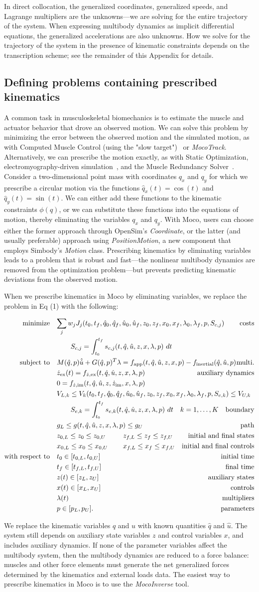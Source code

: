 \documentclass[10pt,letterpaper]{article}
\newcommand{\prescribed}{
\begin{align}
    \begin{aligned}
        \mbox{minimize} \quad & \mathrlap{\sum_j w_j J_{j}(t_0, t_f, \hat{q}_0, \hat{q}_f, \hat{u}_0, \hat{u}_f, z_0, z_f, x_{0}, x_{f}, \lambda_0, \lambda_f, p, S_{c,j})} &&& \textrm{costs} \\
        & \quad\quad \mathrlap{S_{c,j} = \int_{t_0}^{t_f} s_{c,j}(t, \hat{q}, \hat{u}, z, x, \lambda, p)~dt} \\
        \mbox{subject to} \quad &
         M(\hat{q}, p)\hat{\dot{u}} + \mathrlap{G(\hat{q}, p)^T \lambda = f_{\textrm{app}}(t, \hat{q}, \hat{u}, z, x, p) - f_{\textrm{inertial}}(\hat{q}, \hat{u}, p)} &&& \textrm{multi.} \\
        & \mathrlap{\dot{z}_{\textrm{ex}}(t) = f_{\dot{z},\textrm{ex}}(t, \hat{q}, \hat{u}, z, x, \lambda, p)} &&& \textrm{auxiliary dynamics} \\
        & \mathrlap{0 = f_{\dot{z},\textrm{im}}(t, \hat{q}, \hat{u}, z, \dot{z}_\textrm{im}, x, \lambda, p)} \\
        & V_{L,k} \leq V_k(t_0, t_f, \hat{q}_0, \mathrlap{\hat{q}_f, \hat{u}_0, \hat{u}_f, z_0, z_f, x_{0}, x_{f}, \lambda_0, \lambda_f, p, S_{e,k}) \leq V_{U,k}} \\
        & \quad\quad \mathrlap{S_{e,k} = \int_{t_0}^{t_f} s_{e,k}(t, \hat{q}, \hat{u}, z, x, \lambda, p)~dt \quad k = 1, \ldots, K} &&& \textrm{boundary} \\
        & \mathrlap{g_{L} \leq g(t, \hat{q}, \hat{u}, z, x, \lambda, p) \leq g_{U}} &&& \textrm{path} \\
        & z_{0,L} \leq z_0 \leq z_{0,U} && z_{f,L} \leq z_f \leq z_{f,U} & \textrm{initial and final states} \\
        & x_{0,L} \leq x_0 \leq x_{0,U} && x_{f,L} \leq x_f \leq x_{f,U} & \textrm{initial and final controls} \\
        \mbox{with respect to} \quad
        & t_0 \in [t_{0,L}, t_{0,U}] &&& \textrm{initial time} \\
        & t_f \in [t_{f,L}, t_{f,U}] &&& \textrm{final time} \\
        & z(t) \in [z_{L}, z_{U}] &&& \textrm{auxiliary states} \\
        & x(t) \in [x_{L}, x_{U}] &&& \textrm{controls} \\
        & \lambda(t) &&& \textrm{multipliers} \\
        & p \in [p_{L}, p_{U}]. &&& \textrm{parameters}
    \end{aligned}
\end{align}
}
\begin{document}
In direct collocation, the generalized coordinates, generalized speeds, and Lagrange multipliers are the unknowns—we are solving for the entire trajectory of the system. When expressing multibody dynamics as implicit differential equations, the generalized accelerations are also unknowns. How we solve for the trajectory of the system in the presence of kinematic constraints depends on the transcription scheme; see the remainder of this Appendix for details.

\subsection*{Defining problems containing prescribed kinematics}

A common task in musculoskeletal biomechanics is to estimate the muscle and actuator behavior that drove an observed motion. We can solve this problem by minimizing the error between the observed motion and the simulated motion, as with Computed Muscle Control (using the "slow target")~\cite{Thelen:2003bba} or \textit{MocoTrack}. Alternatively, we can prescribe the motion exactly, as with Static Optimization, electromyography-driven simulation~\cite{Lloyd:2003}, and the Muscle Redundancy Solver~\cite{Groote:2016dq}. Consider a two-dimensional point mass with coordinates $q_x$ and $q_y$ for which we prescribe a circular motion via the functions $\hat{q}_x(t) = \cos(t)$ and $\hat{q}_y(t) = \sin(t)$. We can either add these functions to the kinematic constraints $\phi(q)$, or we can substitute these functions into the equations of motion, thereby eliminating the variables $q_x$ and $q_y$. With Moco, users can choose either the former approach through OpenSim’s \textit{Coordinate}, or the latter (and usually preferable) approach using \textit{PositionMotion}, a new component that employs Simbody’s \textit{Motion} class. Prescribing kinematics by eliminating variables leads to a problem that is robust and fast—the nonlinear multibody dynamics are removed from the optimization problem—but prevents predicting kinematic deviations from the observed motion.

When we prescribe kinematics in Moco by eliminating variables, we replace the problem in Eq (1) with the following:

\prescribed

We replace the kinematic variables $q$ and $u$ with known quantities $\hat{q}$ and $\hat{u}$. The system still depends on auxiliary state variables $z$ and control variables $x$, and includes auxiliary dynamics. If none of the parameter variables affect the multibody system, then the multibody dynamics are reduced to a force balance: muscles and other force elements must generate the net generalized forces determined by the kinematics and external loads data. The easiest way to prescribe kinematics in Moco is to use the \textit{MocoInverse} tool.
\end{document}
